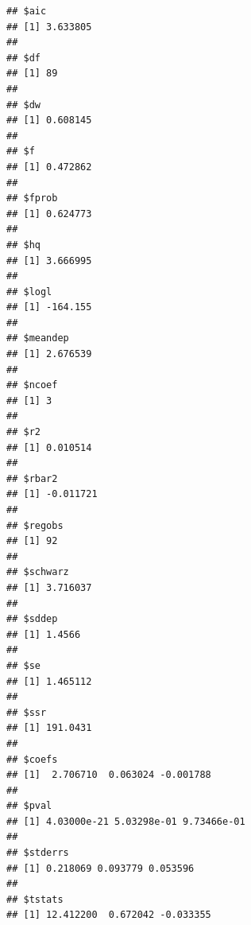 \documentclass[
]{article}
\newenvironment{Shaded}{\begin{snugshade}}{\end{snugshade}}
\newcommand{\NormalTok}[1]{#1}
\newcommand{\SpecialCharTok}[1]{\textcolor[rgb]{0.00,0.00,0.00}{#1}}
\begin{document}
\begin{verbatim}
## $aic
## [1] 3.633805
## 
## $df
## [1] 89
## 
## $dw
## [1] 0.608145
## 
## $f
## [1] 0.472862
## 
## $fprob
## [1] 0.624773
## 
## $hq
## [1] 3.666995
## 
## $logl
## [1] -164.155
## 
## $meandep
## [1] 2.676539
## 
## $ncoef
## [1] 3
## 
## $r2
## [1] 0.010514
## 
## $rbar2
## [1] -0.011721
## 
## $regobs
## [1] 92
## 
## $schwarz
## [1] 3.716037
## 
## $sddep
## [1] 1.4566
## 
## $se
## [1] 1.465112
## 
## $ssr
## [1] 191.0431
## 
## $coefs
## [1]  2.706710  0.063024 -0.001788
## 
## $pval
## [1] 4.03000e-21 5.03298e-01 9.73466e-01
## 
## $stderrs
## [1] 0.218069 0.093779 0.053596
## 
## $tstats
## [1] 12.412200  0.672042 -0.033355
\end{verbatim}

\begin{Shaded}
\end{Shaded}
\end{document}
